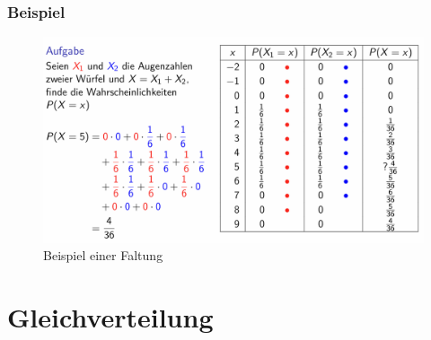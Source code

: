 \documentclass[../Main.tex]{subfiles}
\begin{document}
\subsubsection{Beispiel}

\begin{figure}[H]
    \centering
    \includegraphics[width=1\linewidth]{Images/faltung-beispiel.png}
    \caption{Beispiel einer Faltung}
\end{figure}


\newpage
\section{Gleichverteilung}
\end{document}

